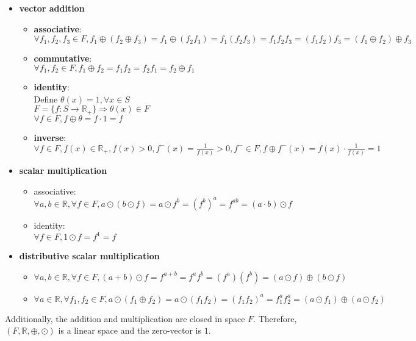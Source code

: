 \documentclass[a4paper,10.5pt]{article}
\newcommand{\R}{\mathbb{R}}
\begin{document}
\clearpage

\begin{itemize}
	\item \textbf{vector addition}
	\begin{itemize}
		\item \textbf{associative}: \\
		$\forall f_1, f_2, f_3 \in F, f_1 \oplus (f_2 \oplus f_3) = f_1 \oplus (f_2 f_3) = f_1 (f_2 f_3) = f_1 f_2 f_3 = (f_1 f_2) f_3 = (f_1 \oplus f_2 ) \oplus f_3$
		\item \textbf{commutative}: \\
		$\forall f_1, f_2 \in F, f_1 \oplus f_2 = f_1 f_2 = f_2 f_1 = f_2 \oplus f_1$
		\item \textbf{identity}: \\
		Define $\theta(x) = 1, \forall x \in S$ \\
		$F = \{f: S\rightarrow \R_+ \} \Rightarrow \theta(x) \in F$ \\
		$\forall f \in F, f \oplus \theta = f \cdot 1 = f$
		\item \textbf{inverse}: \\
		$\forall f \in F, f(x) \in \R_+, f(x) > 0, f^{-}(x) = \frac{1}{f(x)} > 0, f^{-} \in F, f \oplus f^{-} (x) = f(x) \cdot \frac{1}{f(x)} = 1$
	\end{itemize}
	\item \bf{scalar multiplication}
	\begin{itemize}
		\item associative: \\
		$\forall a, b \in \R, \forall f \in F, a \odot (b \odot f) = a \odot f^b = (f^b)^a = f^{ab} = (a \cdot b) \odot f$
		\item identity: \\
		$\forall f \in F, 1 \odot f = f^1 = f$
	\end{itemize}
	\item \bf{distributive scalar multiplication}
	\begin{itemize}
		\item $\forall a, b \in \R, \forall f \in F, (a + b) \odot f = f^{a+b} = f^a f^b = (f^a) (f^b) = (a \odot f) \oplus (b \odot f)$
		\item $\forall a \in \R, \forall f_1, f_2 \in F, a \odot (f_1 \oplus f_2) = a \odot (f_1 f_2) = \left(f_1 f_2\right)^a = f_1^a f_2^a = (a \odot f_1) \oplus (a \odot f_2)$
	\end{itemize}
\end{itemize}
Additionally, the addition and multiplication are closed in space $F$. Therefore, $(F, \R, \oplus,\odot)$ is a linear space and the zero-vector is $1$. \\
\end{document}
